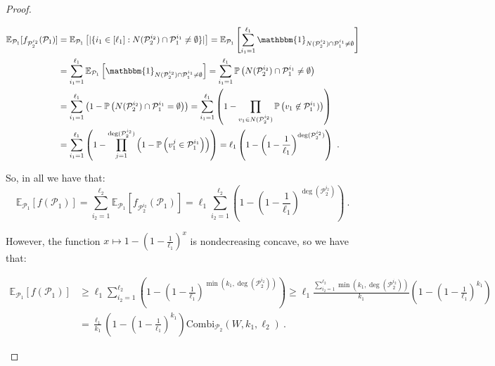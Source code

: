 \documentclass[11pt]{article}
\theoremstyle{definition}
\theoremstyle{remark}
\begin{document}
\begin{proof}
\begin{enumerate}
\begin{equation}
  \begin{aligned}
    \mathbb{E}_{\mathcal{P}_1}[f_{\mathcal{P}_2^{i_2}}(\mathcal{P}_1)] &= \mathbb{E}_{\mathcal{P}_1}\left[|\{i_1 \in [\ell_1]: N(\mathcal{P}_2^{i_2}) \cap \mathcal{P}_1^{i_1} \not= \emptyset  \}|\right]
    = \mathbb{E}_{\mathcal{P}_1}\left[\sum_{i_1=1}^{\ell_1} \mathbbm{1}_{N(\mathcal{P}_2^{i_2}) \cap \mathcal{P}_1^{i_1} \not= \emptyset}\right]\\
    &= \sum_{i_1 = 1}^{\ell_1} \mathbb{E}_{\mathcal{P}_1}\left[\mathbbm{1}_{N(\mathcal{P}_2^{i_2}) \cap \mathcal{P}_1^{i_1} \not= \emptyset}\right]
    = \sum_{i_1 = 1}^{\ell_1}\mathbb{P}\left(N(\mathcal{P}_2^{i_2}) \cap \mathcal{P}_1^{i_1} \not= \emptyset\right)\\
    &= \sum_{i_1 = 1}^{\ell_1}\left(1 - \mathbb{P}\left(N(\mathcal{P}_2^{i_2}) \cap \mathcal{P}_1^{i_1} = \emptyset\right)\right)
    = \sum_{i_1 = 1}^{\ell_1}\left(1 - \prod_{v_1 \in N(\mathcal{P}_2^{i_2})}\mathbb{P}\left(v_1 \not\in \mathcal{P}_1^{i_1})\right)\right)\\
    &=\sum_{i_1 = 1}^{\ell_1}\left(1 - \prod_{j = 1}^{\deg(\mathcal{P}_2^{i_2})}\left(1- \mathbb{P}\left(v_1^j \in \mathcal{P}_1^{i_1}\right)\right)\right) = \ell_1\left(1-\left(1-\frac{1}{\ell_1}\right)^{\deg(\mathcal{P}_2^{i_2})}\right) \ .
  \end{aligned}
\end{equation}

So, in all we have that:
\[ \mathbb{E}_{\mathcal{P}_1}[f(\mathcal{P}_1)] = \sum_{i_2=1}^{\ell_2}\mathbb{E}_{\mathcal{P}_1}[f_{\mathcal{P}_2^{i_2}}(\mathcal{P}_1)] = \ell_1\sum_{i_2=1}^{\ell_2}\left(1-\left(1-\frac{1}{\ell_1}\right)^{\deg(\mathcal{P}_2^{i_2})}\right) \ . \]

However, the function $x \mapsto 1-\left(1-\frac{1}{\ell_1}\right)^x$ is nondecreasing concave, so we have that:

\begin{equation}
  \begin{aligned}
    \mathbb{E}_{\mathcal{P}_1}[f(\mathcal{P}_1)] &\geq \ell_1\sum_{i_2=1}^{\ell_2}\left(1-\left(1-\frac{1}{\ell_1}\right)^{\min(k_1,\deg(\mathcal{P}_2^{i_2}))}\right) \geq \ell_1\frac{\sum_{i_2=1}^{\ell_2}\min(k_1,\deg(\mathcal{P}_2^{i_2}))}{k_1}\left(1-\left(1-\frac{1}{\ell_1}\right)^{k_1}\right)\\
    &= \frac{\ell_1}{k_1}\left(1-\left(1-\frac{1}{\ell_1}\right)^{k_1}\right)\textrm{Combi}_{\mathcal{P}_2}(W,k_1,\ell_2) \ .
  \end{aligned}
\end{equation}


\end{enumerate}
\end{proof}
\end{document}
